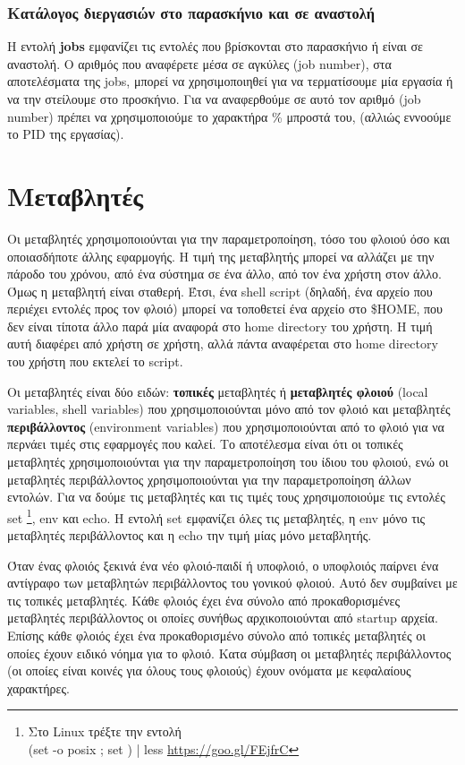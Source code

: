 \subsubsection{Κατάλογος διεργασιών στο παρασκήνιο και σε αναστολή}

Η εντολή \textbf{jobs} εμφανίζει τις εντολές που βρίσκονται στο παρασκήνιο ή είναι  σε αναστολή. Ο αριθμός που αναφέρετε μέσα σε αγκύλες
(job number), στα αποτελέσματα της jobs, μπορεί να χρησιμοποιηθεί για να τερματίσουμε μία εργασία ή να την στείλουμε στο προσκήνιο. Για να
αναφερθούμε σε αυτό τον αριθμό (job number) πρέπει να χρησιμοποιούμε το χαρακτήρα \% μπροστά του, (αλλιώς εννοούμε το PID της εργασίας).

\section{Μεταβλητές}

Οι μεταβλητές χρησιμοποιούνται για την παραμετροποίηση, τόσο του φλοιού όσο και οποιασδήποτε άλλης εφαρμογής. Η τιμή της μεταβλητής μπορεί
να αλλάζει με την πάροδο του χρόνου, από ένα σύστημα σε ένα άλλο, από τον ένα χρήστη στον άλλο. Όμως η μεταβλητή είναι σταθερή. Έτσι, ένα
shell script (δηλαδή, ένα αρχείο που περιέχει εντολές προς τον φλοιό) μπορεί να τοποθετεί ένα αρχείο στο \$HOME, που δεν είναι τίποτα άλλο
παρά μία αναφορά στο home directory του χρήστη. Η τιμή αυτή διαφέρει από χρήστη σε χρήστη, αλλά πάντα αναφέρεται στο home directory του
χρήστη που εκτελεί το script. 

Οι μεταβλητές είναι δύο ειδών: \textbf{τοπικές} μεταβλητές ή \textbf{μεταβλητές φλοιού} (local variables, shell variables) που
χρησιμοποιούνται μόνο από τον φλοιό και μεταβλητές \textbf{περιβάλλοντος} (environment variables) που χρησιμοποιούνται από το φλοιό για να
περνάει τιμές στις εφαρμογές που καλεί. Το αποτέλεσμα είναι ότι οι τοπικές μεταβλητές χρησιμοποιούνται για την παραμετροποίηση του ίδιου του
φλοιού, ενώ οι μεταβλητές περιβάλλοντος χρησιμοποιούνται για την παραμετροποίηση άλλων εντολών. Για να δούμε τις μεταβλητές και τις τιμές
τους χρησιμοποιούμε τις εντολές set \footnote{Στο Linux τρέξτε την εντολή \\ (set -o posix ; set ) | less \href{https://unix.stackexchange.com/questions/364270/what-is-set-o-posix-set-less-doing}{https://goo.gl/FEjfrC}}, env και echo. Η εντολή set εμφανίζει όλες τις μεταβλητές, η env μόνο τις μεταβλητές περιβάλλοντος και η
echo την τιμή μίας μόνο μεταβλητής.

Όταν ένας φλοιός ξεκινά ένα νέο φλοιό-παιδί ή υποφλοιό, ο υποφλοιός παίρνει ένα αντίγραφο των μεταβλητών περιβάλλοντος του γονικού φλοιού.
Αυτό δεν συμβαίνει με τις τοπικές μεταβλητές. Κάθε φλοιός έχει ένα σύνολο από προκαθορισμένες μεταβλητές περιβάλλοντος οι οποίες συνήθως
αρχικοποιούνται από startup αρχεία. Επίσης κάθε φλοιός έχει ένα προκαθορισμένο σύνολο από τοπικές μεταβλητές οι οποίες έχουν ειδικό νόημα
για το φλοιό. Κατα σύμβαση οι μεταβλητές περιβάλλοντος (οι οποίες είναι κοινές για όλους τους φλοιούς) έχουν ονόματα με κεφαλαίους
χαρακτήρες. 

